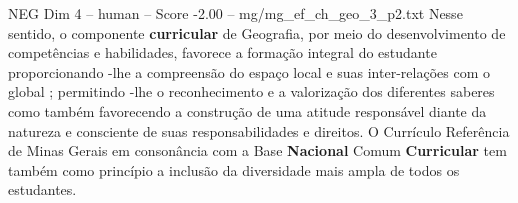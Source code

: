 \begin{textsample}{NEG Dim 4 – human – Score -2.00 – mg/mg\_ef\_ch\_geo\_3\_p2.txt}  \label{ex:f4_neg_007}
Nesse sentido, o componente \textbf{curricular} de Geografia, por meio do desenvolvimento de competências e habilidades, favorece a formação integral do estudante proporcionando -lhe a compreensão do espaço local e suas inter-relações com o global ; permitindo -lhe o reconhecimento e a valorização dos diferentes saberes como também favorecendo a construção de uma atitude responsável diante da natureza e consciente de suas responsabilidades e direitos.
O Currículo Referência de Minas Gerais em consonância com a Base \textbf{Nacional} Comum \textbf{Curricular} tem também como princípio a inclusão da diversidade mais ampla de todos os estudantes.

\end{textsample}
